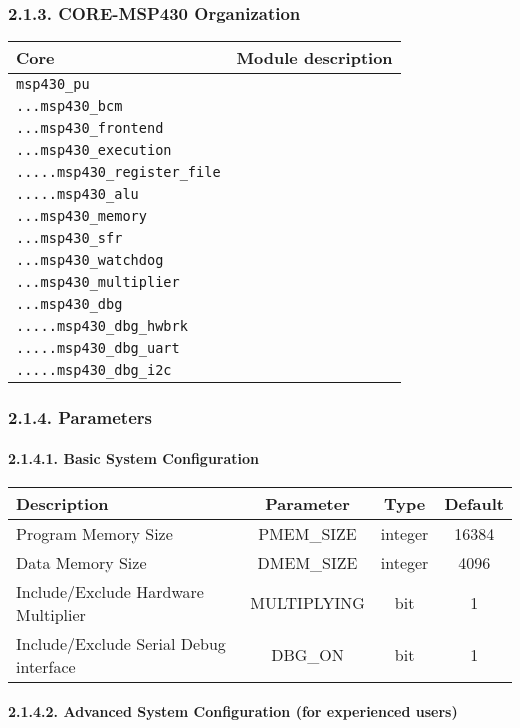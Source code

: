 \documentclass[]{article}
\let\oldparagraph\paragraph
\renewcommand{\paragraph}[1]{\oldparagraph{#1}\mbox{}}
\begin{document}
\hypertarget{core-msp430-organization}{%
\subsubsection{2.1.3. CORE-MSP430
Organization}\label{core-msp430-organization}}

\begin{longtable}[]{@{}ll@{}}
\toprule
Core & Module description\tabularnewline
\midrule
\endhead
\texttt{msp430\_pu} &\tabularnewline
\texttt{...msp430\_bcm} &\tabularnewline
\texttt{...msp430\_frontend} &\tabularnewline
\texttt{...msp430\_execution} &\tabularnewline
\texttt{.....msp430\_register\_file} &\tabularnewline
\texttt{.....msp430\_alu} &\tabularnewline
\texttt{...msp430\_memory} &\tabularnewline
\texttt{...msp430\_sfr} &\tabularnewline
\texttt{...msp430\_watchdog} &\tabularnewline
\texttt{...msp430\_multiplier} &\tabularnewline
\texttt{...msp430\_dbg} &\tabularnewline
\texttt{.....msp430\_dbg\_hwbrk} &\tabularnewline
\texttt{.....msp430\_dbg\_uart} &\tabularnewline
\texttt{.....msp430\_dbg\_i2c} &\tabularnewline
\bottomrule
\end{longtable}

\hypertarget{parameters}{%
\subsubsection{2.1.4. Parameters}\label{parameters}}

\hypertarget{basic-system-configuration}{%
\paragraph{2.1.4.1. Basic System
Configuration}\label{basic-system-configuration}}

\begin{longtable}[]{@{}lccc@{}}
\toprule
Description & Parameter & Type & Default\tabularnewline
\midrule
\endhead
Program Memory Size & PMEM\_SIZE & integer & 16384\tabularnewline
Data Memory Size & DMEM\_SIZE & integer & 4096\tabularnewline
Include/Exclude Hardware Multiplier & MULTIPLYING & bit &
1\tabularnewline
Include/Exclude Serial Debug interface & DBG\_ON & bit &
1\tabularnewline
\bottomrule
\end{longtable}

\hypertarget{advanced-system-configuration-for-experienced-users}{%
\paragraph{2.1.4.2. Advanced System Configuration (for experienced
users)}\label{advanced-system-configuration-for-experienced-users}}
\end{document}
